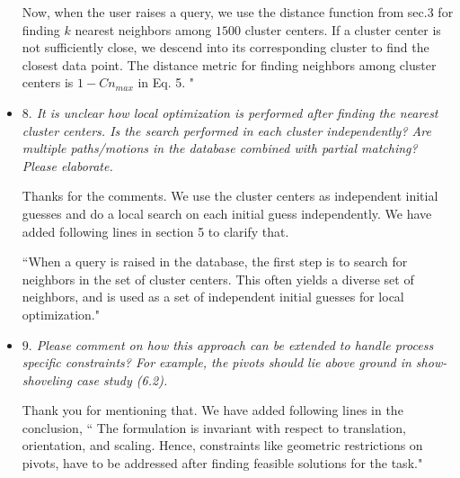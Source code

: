 \documentclass{article}
\begin{document}
\begin{itemize}
Now, when the user raises a query, we use the distance function from sec.3 for finding $k$ nearest neighbors among $1500$ cluster centers.
If a cluster center is not sufficiently close, we descend into its corresponding cluster to find the closest data point.
The distance metric for finding neighbors among cluster centers is $1-Cn_{max}$ in Eq. 5.  "
\\

  \item \emph{
$8.$ It is unclear how local optimization is performed after finding the nearest cluster centers. Is the
search performed in each cluster independently? Are multiple paths/motions in the database
combined with partial matching? Please elaborate.
}

Thanks for the comments.
We use the cluster centers as independent initial guesses and do a local search on each initial guess independently.
We have added following lines in section 5 to clarify that.

``When a query is raised in the database, the first step is to search for neighbors in the set of cluster centers.
This often yields a diverse set of neighbors, and is used as a set of independent initial guesses for local optimization."
\\


  \item \emph{
$9.$ Please comment on how this approach can be extended to handle process specific constraints?
For example, the pivots should lie above ground in show-shoveling case study (6.2).
}

Thank you for mentioning that. We have added following lines in the conclusion,
`` The formulation is invariant with respect to translation, orientation, and scaling.
Hence, constraints like geometric restrictions on pivots, have to be addressed after finding feasible solutions for the task."

\end{itemize}



\end{document}
